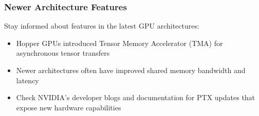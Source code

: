 \subsubsection{Newer Architecture Features}

Stay informed about features in the latest GPU architectures:

\begin{itemize}
    \item Hopper GPUs introduced Tensor Memory Accelerator (TMA) for asynchronous tensor transfers
    \item Newer architectures often have improved shared memory bandwidth and latency
    \item Check NVIDIA's developer blogs and documentation for PTX updates that expose new hardware capabilities
\end{itemize}

